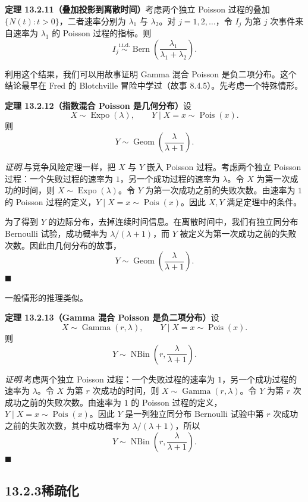 \documentclass[UTF8, 12pt, fontset=fandol, oneside]{ctexart}
\begin{document}
\noindent\textbf{定理 13.2.11（叠加投影到离散时间）}\quad 考虑两个独立 Poisson 过程的叠加 $\{N(t):t>0\}$，二者速率分别为 $\lambda_1$ 与 $\lambda_2$。对 $j=1,2,\ldots$，令 $I_j$ 为第 $j$ 次事件来自速率为 $\lambda_1$ 的 Poisson 过程的指标。则
\[
  I_j\stackrel{\text{i.i.d.}}{\sim}\operatorname{Bern}\left(\frac{\lambda_1}{\lambda_1+\lambda_2}\right).
\]

利用这个结果，我们可以用故事证明 Gamma 混合 Poisson 是负二项分布。这个结论最早在 Fred 的 Blotchville 冒险中学过（故事 8.4.5）。先考虑一个特殊情形。

\noindent\textbf{定理 13.2.12（指数混合 Poisson 是几何分布）}\quad 设
\[
  X\sim\operatorname{Expo}(\lambda),\qquad Y\mid X=x\sim\operatorname{Pois}(x).
\]
则
\[
  Y\sim\operatorname{Geom}\left(\frac{\lambda}{\lambda+1}\right).
\]

\noindent\textit{证明.}\quad 与竞争风险定理一样，把 $X$ 与 $Y$ 嵌入 Poisson 过程。考虑两个独立 Poisson 过程：一个失败过程的速率为 $1$，另一个成功过程的速率为 $\lambda$。令 $X$ 为第一次成功的时间，则 $X\sim\operatorname{Expo}(\lambda)$。令 $Y$ 为第一次成功之前的失败次数。由速率为 $1$ 的 Poisson 过程的定义，$Y\mid X=x\sim\operatorname{Pois}(x)$。因此 $X,Y$ 满足定理中的条件。

为了得到 $Y$ 的边际分布，去掉连续时间信息。在离散时间中，我们有独立同分布 Bernoulli 试验，成功概率为 $\lambda/(\lambda+1)$，而 $Y$ 被定义为第一次成功之前的失败次数。因此由几何分布的故事，
\[
  Y\sim\operatorname{Geom}\left(\frac{\lambda}{\lambda+1}\right).
\]
$\blacksquare$

一般情形的推理类似。

\noindent\textbf{定理 13.2.13（Gamma 混合 Poisson 是负二项分布）}\quad 设
\[
  X\sim\operatorname{Gamma}(r,\lambda),\qquad Y\mid X=x\sim\operatorname{Pois}(x).
\]
则
\[
  Y\sim\operatorname{NBin}\left(r,\frac{\lambda}{\lambda+1}\right).
\]

\noindent\textit{证明.}\quad 考虑两个独立 Poisson 过程：一个失败过程的速率为 $1$，另一个成功过程的速率为 $\lambda$。令 $X$ 为第 $r$ 次成功的时间，则 $X\sim\operatorname{Gamma}(r,\lambda)$。令 $Y$ 为第 $r$ 次成功之前的失败次数。由速率为 $1$ 的 Poisson 过程的定义，$Y\mid X=x\sim\operatorname{Pois}(x)$。因此 $Y$ 是一列独立同分布 Bernoulli 试验中第 $r$ 次成功之前的失败次数，其中成功概率为 $\lambda/(\lambda+1)$，所以
\[
  Y\sim\operatorname{NBin}\left(r,\frac{\lambda}{\lambda+1}\right).
\]
$\blacksquare$

\subsection*{13.2.3\quad 稀疏化}
\end{document}
